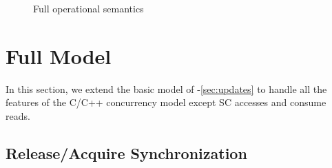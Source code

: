 {\begin{landscape}
\begin{figure*}[t]
\caption{Full operational semantics}
\label{fig:full-opsem-a}
\end{figure*}
\end{landscape}
}


\section{Full Model}
\label{sec:full}

In this section, we extend the basic model of
-\ref{sec:updates} to handle all the
features of the C/C++ concurrency model except SC accesses and consume reads.


\subsection{Release/Acquire Synchronization}
\label{sec:relacq}

